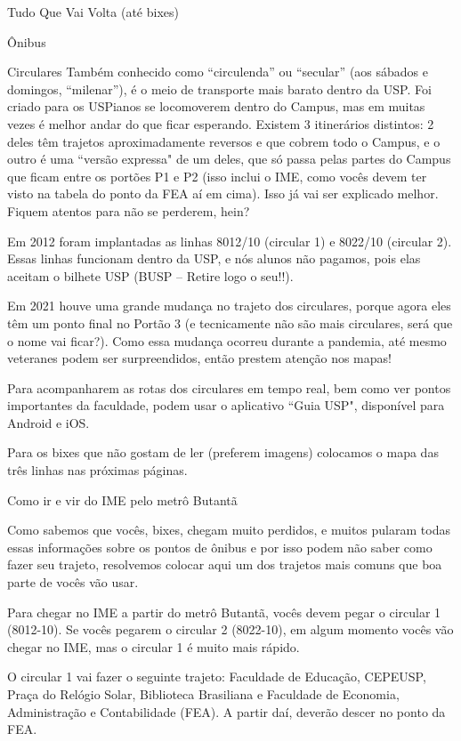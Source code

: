 \begin{secao}{Tudo Que Vai Volta (até bixes)}
\begin{subsecao}{Ônibus}
\begin{subsubsecao}{Circulares}
Também conhecido como ``circulenda'' ou ``secular'' (aos sábados e domingos,
``milenar''), é o meio de transporte mais barato dentro da USP. Foi criado para
os USPianos se locomoverem dentro do Campus, mas em muitas vezes é melhor andar
do que ficar esperando. Existem 3 itinerários distintos: 2 deles têm trajetos
aproximadamente reversos e que cobrem todo o Campus, e o outro é uma
``versão expressa" de um deles, que só passa pelas partes do Campus que ficam
entre os portões P1 e P2 (isso inclui o IME, como vocês devem ter visto na
tabela do ponto da FEA aí em cima). Isso já vai ser explicado melhor. Fiquem
atentos para não se perderem, hein?

Em 2012 foram implantadas as linhas 8012/10 (circular 1) e 8022/10 (circular 2).
Essas linhas funcionam dentro da USP, e nós alunos não pagamos, pois elas
aceitam o bilhete USP (BUSP -- Retire logo o seu!!).

Em 2021 houve uma grande mudança no trajeto dos circulares, porque agora eles
têm um ponto final no Portão 3 (e tecnicamente não são mais circulares, será que
o nome vai ficar?). Como essa mudança ocorreu durante a pandemia, até mesmo
veteranes podem ser surpreendidos, então prestem atenção nos mapas!

Para acompanharem as rotas dos circulares em tempo real, bem como ver pontos
importantes da faculdade, podem usar o aplicativo ``Guia USP", disponível para
Android e iOS.

Para os bixes que não gostam de ler (preferem imagens) colocamos o
mapa das três linhas nas próximas páginas.


\end{subsubsecao}

\begin{subsubsecao}{Como ir e vir do IME pelo metrô Butantã}

Como sabemos que vocês, bixes, chegam muito perdidos, e muitos pularam todas
essas informações sobre os pontos de ônibus e por isso podem não saber como
fazer seu trajeto, resolvemos colocar aqui um dos trajetos mais comuns que boa
parte de vocês vão usar.

Para chegar no IME a partir do metrô Butantã, vocês devem pegar o circular 1
(8012-10). Se vocês pegarem o circular 2 (8022-10), em algum momento vocês 
vão chegar no IME, mas o circular 1 é muito mais rápido.

O circular 1 vai fazer o seguinte trajeto: Faculdade de Educação, CEPEUSP,
Praça do Relógio Solar, Biblioteca Brasiliana e Faculdade de Economia,
Administração e Contabilidade (FEA). A partir daí, deverão descer no ponto da
FEA.


\end{subsubsecao}
\end{subsecao}
\end{secao}
